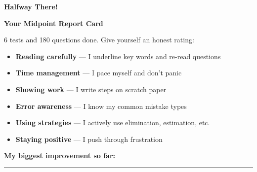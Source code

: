\clearpage
\thispagestyle{empty}
{\sffamily

\begin{center}
{\fontsize{22}{26}\selectfont\bfseries\color{funPink} \faFlagCheckered\hspace{3mm}Halfway There!\hspace{3mm}\faFlagCheckered}

\vspace{2mm}
{\color{funGray}\hrulefill}
\end{center}

\vspace{3mm}

\begin{tcolorbox}[
    enhanced,
    colback=funPinkLight,
    colframe=funPink!50,
    arc=10pt,
    boxrule=1.5pt,
    left=6mm, right=6mm, top=5mm, bottom=5mm,
]
{\large\bfseries\color{funPinkDark} \faClipboardCheck\hspace{2mm}Your Midpoint Report Card}

\vspace{2mm}

6 tests and 180 questions done. Give yourself an honest rating:

\vspace{3mm}

\begin{itemize}[leftmargin=6mm, itemsep=4pt]
    \item[$\square$] \textbf{Reading carefully} — I underline key words and re-read questions
    \item[$\square$] \textbf{Time management} — I pace myself and don't panic
    \item[$\square$] \textbf{Showing work} — I write steps on scratch paper
    \item[$\square$] \textbf{Error awareness} — I know my common mistake types
    \item[$\square$] \textbf{Using strategies} — I actively use elimination, estimation, etc.
    \item[$\square$] \textbf{Staying positive} — I push through frustration
\end{itemize}

\vspace{2mm}

\textbf{My biggest improvement so far:} \rule[-2pt]{5cm}{0.5pt}

\vspace{2mm}


\end{tcolorbox}}
